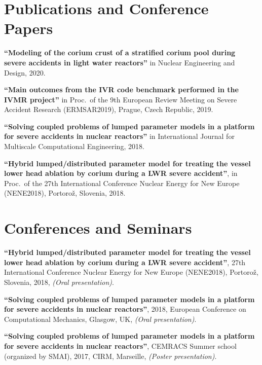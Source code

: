 \documentclass{article}
\renewenvironment{itemize}{
  \begin{list}{}{
      \setlength{\leftmargin}{1.5em}
      \setlength{\itemsep}{0.25em}
      \setlength{\parskip}{0pt}
      \setlength{\parsep}{0.25em}
    }
}{
  \end{list}
}
\begin{document}
\section*{Publications and Conference Papers}
\begin{itemize}
	\item \textbf{``Modeling of the corium crust of a stratified corium pool during severe accidents in light water reactors''} in Nuclear Engineering and Design, 2020. 
	\item \textbf{``Main outcomes from the IVR code benchmark performed in the IVMR project''} in Proc.~of the 9th European Review Meeting on Severe Accident Research (ERMSAR2019),
Prague, Czech Republic, 2019.
	\item \textbf{``Solving coupled problems of lumped parameter models in a platform for severe accidents in nuclear reactors''} in International Journal for Multiscale Computational Engineering, 2018.
	\item \textbf{``Hybrid lumped/distributed parameter model for treating the vessel lower head ablation by corium during a LWR severe accident''}, in Proc.~of the 27th International Conference Nuclear Energy for New Europe (NENE2018), Portorož, Slovenia, 2018.
\end{itemize}  

\section*{Conferences and Seminars}
\begin{itemize}
	\item \textbf{``Hybrid lumped/distributed parameter model for treating the vessel lower head ablation by corium during a LWR severe accident''}, 27th International Conference Nuclear Energy for New Europe (NENE2018), Portorož, Slovenia, 2018, \textit{(Oral presentation)}.
	\item \textbf{``Solving coupled problems of lumped parameter models in a platform for severe accidents in nuclear reactors''}, 2018, European Conference on Computational Mechanics, Glasgow, UK, \textit{(Oral presentation)}.
	\item \textbf{``Solving coupled problems of lumped parameter models in a platform for severe accidents in nuclear reactors''}, CEMRACS Summer school (organized by SMAI), 2017, CIRM, Marseille, \textit{(Poster presentation)}.
\end{itemize}  
\end{document}

